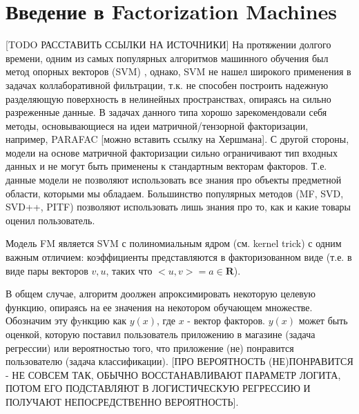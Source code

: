 \documentclass[12pt,a4paper]{report}
\begin{document}
\section{Введение в Factorization Machines}
[TODO РАССТАВИТЬ ССЫЛКИ НА ИСТОЧНИКИ]
На протяжении долгого времени, одним из самых популярных алгоритмов машинного обучения был метод опорных векторов (SVM) , однако, SVM не нашел широкого применения в задачах коллаборативной фильтрации, т.к. не способен построить надежную разделяющую поверхность в нелинейных пространствах, опираясь на сильно разреженные данные. В задачах данного типа хорошо зарекомендовали себя методы, основывающиеся на идеи матричной/тензорной факторизации, например, PARAFAC [можно вставить ссылку на Хершмана]. С другой стороны, модели на основе матричной факторизации сильно ограничивают тип входных данных и не могут быть применены к стандартным векторам факторов. Т.е. данные модели не позволяют использовать все знания про объекты предметной области, которыми мы обладаем. Большинство популярных методов (MF, SVD, SVD++, PITF) позволяют использовать лишь знания про то, как и какие товары оценил пользователь.

Модель FM является SVM с полиномиальным ядром (см. kernel trick) с одним важным отличием: коэффициенты представляются в факторизованном виде (т.е. в виде пары векторов $v, u$, таких что $<u,v> = a \in \textbf{R}$).

В общем случае, алгоритм доолжен апроксимировать некоторую целевую функцию, опираясь на ее значения на некотором обучающем множестве. Обозначим эту фyнкцию как $y(x)$, где $x$ - вектор факторов. $y(x)$ может быть оценкой, которую поставил пользователь приложению в магазине (задача регрессии) или вероятностью того, что приложение (не) понравится пользователю (задача классификации). [ПРО ВЕРОЯТНОСТЬ (НЕ)ПОНРАВИТСЯ - НЕ СОВСЕМ ТАК, ОБЫЧНО ВОССТАНАВЛИВАЮТ ПАРАМЕТР ЛОГИТА, ПОТОМ ЕГО ПОДСТАВЛЯЮТ В ЛОГИСТИЧЕСКУЮ РЕГРЕССИЮ И ПОЛУЧАЮТ НЕПОСРЕДСТВЕННО ВЕРОЯТНОСТЬ].
\end{document}
